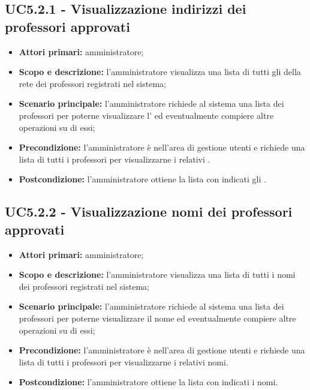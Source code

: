 \documentclass[AnalisiDeiRequisiti.tex]{subfiles}
\begin{document}
\subsection{UC5.2.1 - Visualizzazione indirizzi dei professori approvati}
\begin{itemize}
	\item \textbf{Attori primari:} amministratore;
	\item \textbf{Scopo e descrizione:} l'amministratore visualizza una lista di tutti gli  della rete  dei professori registrati nel sistema;
	\item \textbf{Scenario principale:} l'amministratore richiede al sistema una lista dei professori per poterne visualizzare l' ed eventualmente compiere altre operazioni su di essi;
	\item \textbf{Precondizione:} l'amministratore è nell'area di gestione utenti e richiede una lista di tutti i professori per visualizzarne i relativi .
	\item \textbf{Postcondizione:} l'amministratore ottiene la lista con indicati gli .
\end{itemize}
\subsection{UC5.2.2 - Visualizzazione nomi dei professori approvati}
\begin{itemize}
	\item \textbf{Attori primari:} amministratore;
	\item \textbf{Scopo e descrizione:} l'amministratore visualizza una lista di tutti i nomi dei professori registrati nel sistema;
	\item \textbf{Scenario principale:} l'amministratore richiede al sistema una lista dei professori per poterne visualizzare il nome ed eventualmente compiere altre operazioni su di essi;
	\item \textbf{Precondizione:} l'amministratore è nell'area di gestione utenti e richiede una lista di tutti i professori per visualizzarne i relativi nomi.
	\item \textbf{Postcondizione:} l'amministratore ottiene la lista con indicati i nomi.
\end{itemize}
\end{document}
